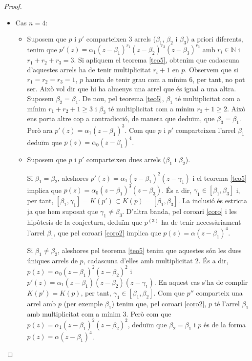 \documentclass[11pt,a4paper]{article}
\theoremstyle{definition}
\newcommand{\NN}{\ensuremath{\mathbb{N}}}
\begin{document}
\begin{proof}
\begin{itemize}
        \item Cas $n=4$:\par
              \begin{itemize}
                  \item Suposem que $p$ i $p'$ comparteixen 3 arrels ($\beta_1$, $\beta_2$ i $\beta_3$) a priori diferents, tenim que $p'(z)=\alpha_1(z-\beta_1)^{r_1}(z-\beta_2)^{r_2}(z-\beta_3)^{r_3}$ amb $r_i\in\NN$ i $r_1+r_2+r_3=3$. Si apliquem el teorema \ref{teo5}, obtenim que cadascuna d'aquestes arrels ha de tenir multiplicitat $r_i+1$ en $p$. Observem que si $r_1=r_2=r_3=1$, $p$ hauria de tenir grau com a mínim 6, per tant, no pot ser. Això vol dir que hi ha almenys una arrel que és igual a una altra. Suposem $\beta_2=\beta_1$. De nou, pel teorema \ref{teo5}, $\beta_1$ té multiplicitat com a mínim $r_1+r_2+1\geq 3$ i $\beta_3$ té multiplicitat com a mínim $r_3+1\geq 2$. Això ens porta altre cop a contradicció, de manera que deduïm, que $\beta_3=\beta_1$. Però ara $p'(z)=\alpha_1(z-\beta_1)^3$. Com que $p$ i $p'$ comparteixen l'arrel $\beta_1$ deduïm que $p(z)=\alpha_0(z-\beta_1)^4$.
                  \item Suposem que $p$ i $p'$ comparteixen dues arrels ($\beta_1$ i $\beta_2$).\par Si $\beta_1=\beta_2$, aleshores $p'(z)=\alpha_1(z-\beta_1)^2(z-\gamma_1)$ i el teorema \ref{teo5} implica que $p(z)=\alpha_0(z-\beta_1)^3(z-\beta_3)$. És a dir, $\gamma_1\in[\beta_1,\beta_3]$ i, per tant, $[\beta_1,\gamma_1]=K(p')\subset K(p)=[\beta_1,\beta_3]$. La inclusió és estricta ja que hem suposat que $\gamma_1\ne\beta_3$. D'altra banda, pel coro\lgem ari \ref{coro} i les hipòtesis de la conjectura, deduïm que $p^{(3)}$ ha de tenir necessàriament l'arrel $\beta_1$, que pel coro\lgem ari \ref{coro2} implica que $p(z)=\alpha(z-\beta_1)^4$.\par Si $\beta_1\ne\beta_2$, aleshores pel teorema \ref{teo5} tenim que aquestes són les dues úniques arrels de $p$, cadascuna d'elles amb multiplicitat 2. És a dir, $p(z)=\alpha_0(z-\beta_1)^2(z-\beta_2)^2$ i $p'(z)=\alpha_1(z-\beta_1)(z-\beta_2)(z-\gamma_1)$. En aquest cas s'ha de complir $K(p')=K(p)$, per tant, $\gamma_1\in[\beta_1,\beta_2]$. Com que $p''$ comparteix una arrel amb $p$ (per exemple $\beta_1$) tenim que, pel coro\lgem ari \ref{coro2}, $p$ té l'arrel $\beta_1$ amb multiplicitat com a mínim 3. Però com que $p(z)=\alpha_1(z-\beta_1)^2(z-\beta_2)^2$, deduïm que $\beta_2=\beta_1$ i $p$ és de la forma $p(z)=\alpha(z-\beta_1)^4$.

\end{itemize}
\end{itemize}
\end{proof}
\end{document}
